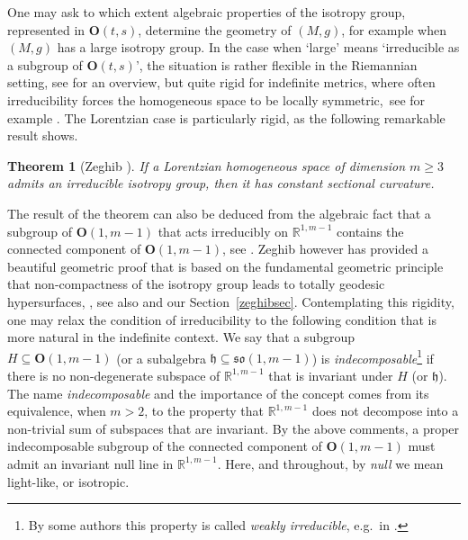 \documentclass[11pt,a4paper]{amsart}
\newcommand{\h}{\mathfrak{h}}
\newcommand{\+}{\oplus}
\newcommand{\so}{\mathfrak{so}}
\renewcommand{\O}{\mathbf{O}}
\newcommand{\1}{\mathbf{1}}
\newcommand{\R}{\mathbb{R}} %
\newcommand{\<}{\langle}
\renewcommand{\>}{\rangle}
\theoremstyle{definition}
\theoremstyle{plain}
\newtheorem{theorem}[definition]{Theorem}
\numberwithin{equation}{section}
\begin{document}
One may ask to which extent algebraic properties of the isotropy group, represented in $\O(t,s)$, determine the geometry of $(M,g)$, for example when $(M,g)$ has a large  isotropy group.  In the case when `large' means `irreducible as a subgroup of $\O(t,s)$', the situation is rather flexible in the Riemannian setting, see  \cite[Chapter 7]{besse87} for an overview, but quite rigid for indefinite metrics, where often irreducibility  forces the homogeneous space to be locally symmetric,~see for example \cite{CortesMeinke17,CortesMeinke18}. The Lorentzian case is particularly rigid, as the following remarkable result shows.
\begin{theorem}[Zeghib \cite{zeghib04}]
\label{zeghibtheo}
If a Lorentzian homogeneous space of dimension $m\ge 3$ admits an irreducible isotropy group, then it has constant sectional curvature.
\end{theorem}
The result of the theorem can also be deduced from the algebraic fact that a subgroup of $\O(1,m-1)$ that acts irreducibly on $\R^{1,m-1}$ contains the connected component of $\O(1,m-1)$, see \cite{benoist-harpe03,olmos-discala01,att05}. Zeghib however has provided a  beautiful geometric proof that is based on the fundamental geometric principle that non-compactness of the isotropy group leads to totally geodesic hypersurfaces,  \cite{zeghib04}, see also \cite{AroucheDeffafZeghib07} and our Section~\ref{zeghibsec}. Contemplating this rigidity, one may relax the condition of irreducibility to the following condition that is more natural in the indefinite context. We say that a subgroup $H\subseteq \O(1,m-1)$ (or a subalgebra $\h\subseteq \so(1,m-1)$) is {\em indecomposable}\footnote{By some authors  this property is called {\em weakly irreducible}, e.g.~in  \cite{olmos-discala01,ErnstGalaev22,ErnstGalaev23}.} if  there is no non-degenerate subspace of $\R^{1,m-1}$ that is invariant under $H$ (or $\h$). The name {\em indecomposable} and the importance of the concept comes from its equivalence, when $m>2$, to the  property that $\R^{1,m-1}$ does not decompose  into a non-trivial sum of subspaces that are invariant.
By the above comments, a proper indecomposable subgroup of the connected component of $\O(1,m-1)$ must admit an invariant null line in $\R^{1,m-1}$. Here, and throughout, by {\em null} we mean light-like, or isotropic.
\end{document}
